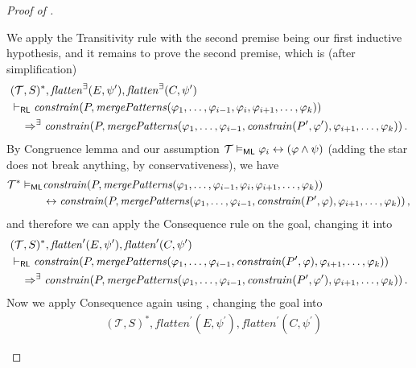 \begin{proof}[Proof of ]
\begin{enumerate}
    We apply the Transitivity rule with the second premise being our first inductive hypothesis, and it remains to prove the second premise, which is (after simplification)
    \begin{align*}
        & (\mathcal{T}, S)^*, \mathit{flatten}^\exists(E, \psi^\prime), \mathit{flatten}^\exists(C, \psi^\prime)
        \\& \vdash_{\mathsf{RL}}
        \mathit{constrain}(P, \mathit{mergePatterns}(\varphi_1, \ldots, \varphi_{i-1}, \varphi_i, \varphi_{i+1}, \ldots,                          \varphi_k))
        \\&\quad \Rightarrow^\exists
        \mathit{constrain}(P, \mathit{mergePatterns}(\varphi_1, \ldots, \varphi_{i-1}, \mathit{constrain}(P^\prime, \varphi^\prime), \varphi_{i+1}, \ldots, \varphi_k) ) \, .
    \end{align*}
    By Congruence lemma and our assumption $\mathcal{T} \vDash_{\mathsf{ML}} \varphi_i \leftrightarrow (\varphi \land \psi)$ (adding the star does not break anything, by conservativeness), we have
    \begin{align*}
        \mathcal{T}^* \vDash_{\mathsf{ML}} &
        \mathit{constrain}(P, \mathit{mergePatterns}(\varphi_1, \ldots, \varphi_{i-1}, \varphi_i, \varphi_{i+1}, \ldots,                          \varphi_k))
        \\ & \leftrightarrow
        \mathit{constrain}(P, \mathit{mergePatterns}(\varphi_1, \ldots, \varphi_{i-1}, \mathit{constrain}(P^\prime, \varphi), \varphi_{i+1}, \ldots, \varphi_k)) \, ,
    \end{align*}
    and therefore we can apply the Consequence rule on the goal, changing it into
    \begin{align*}
        & (\mathcal{T}, S)^*, \mathit{flatten}^\prime(E, \psi^\prime), \mathit{flatten}^\prime(C, \psi^\prime)
        \\& \vdash_{\mathsf{RL}}
        \mathit{constrain}(P, \mathit{mergePatterns}(\varphi_1, \ldots, \varphi_{i-1}, \mathit{constrain}(P^\prime, \varphi), \varphi_{i+1}, \ldots,                          \varphi_k))
        \\&\quad \Rightarrow^\exists
        \mathit{constrain}(P, \mathit{mergePatterns}(\varphi_1, \ldots, \varphi_{i-1}, \mathit{constrain}(P^\prime, \varphi^\prime), \varphi_{i+1}, \ldots, \varphi_k)) \, .
    \end{align*}
    Now we apply Consequence again using ,
    changing the goal into
    \begin{align*}
        & (\mathcal{T}, S)^*, \mathit{flatten}^\prime(E, \psi^\prime), \mathit{flatten}^\prime(C, \psi^\prime)

\end{align*}
\end{enumerate}
\end{proof}
